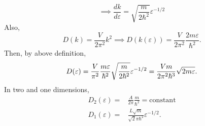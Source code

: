\begin{equation}
    \implies \frac{dk}{d\varepsilon} = \sqrt{\frac{m}{2\hbar^2}}\varepsilon^{-1/2}
\end{equation}
Also, 
\begin{equation}
    D(k)=\frac{V}{2\pi^2}k^2 \implies D(k(\varepsilon)) = \frac{V}{2\pi^2}\frac{2m\varepsilon}{\hbar^2}.
\end{equation}
Then, by above definition,
\begin{equation}
    D(\varepsilon) = \frac{V}{\pi^2}\frac{m\varepsilon}{\hbar^2}\sqrt{\frac{m}{2\hbar^2}}\varepsilon^{-1/2} = \frac{Vm}{2\pi^2\hbar^3}\sqrt{2m\varepsilon}.
\end{equation}
In two and one dimensions,
\begin{align}
    D_2(\varepsilon) =& \frac{A}{2\pi}\frac{m}{\hbar^2}=\mathrm{constant}\\
    D_1(\varepsilon) =& \frac{L\sqrt{m}}{\sqrt{2}\pi\hbar^2}\varepsilon^{-1/2}.
\end{align}

